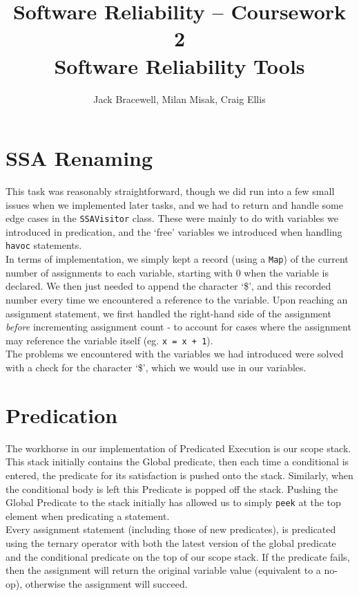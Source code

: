 \documentclass[11pt]{article}
\title{Software Reliability -- Coursework 2 \\ Software Reliability Tools}
\author{Jack Bracewell, Milan Misak, Craig Ellis}
\date{}
\begin{document}
\maketitle

\section{SSA Renaming}

This task was reasonably straightforward, though we did run into a few small issues when we implemented later tasks, and we had to return and handle some edge cases in the \verb|SSAVisitor| class. These were mainly to do with variables we introduced in predication, and the `free' variables we introduced when handling \verb|havoc| statements. \\

In terms of implementation, we simply kept a record (using a \verb|Map|) of the current number of assignments to each variable, starting with 0 when the variable is declared. We then just needed to append the character `\$', and this recorded number every time we encountered a reference to the variable. Upon reaching an assignment statement, we first handled the right-hand side of the assignment \emph{before} incrementing assignment count - to account for cases where the assignment may reference the variable itself (eg. \verb|x = x + 1|). \\

The problems we encountered with the variables we had introduced were solved with a check for the character `\$', which we would use in our variables. \\

\section{Predication}

The workhorse in our implementation of Predicated Execution is our scope stack. This stack initially contains the Global predicate, then each time a conditional is entered, the predicate for its satisfaction is pushed onto the stack. Similarly, when the conditional body is left this Predicate is popped off the stack. Pushing the Global Predicate to the stack initially has allowed us to simply \verb|peek| at the top element when predicating a statement. \\

Every assignment statement (including those of new predicates), is predicated using the ternary operator with both the latest version of the global predicate and the conditional predicate on the top of our scope stack. If the predicate fails, then the assignment will return the original variable value (equivalent to a no-op), otherwise the assignment will succeed. \\
\end{document}
